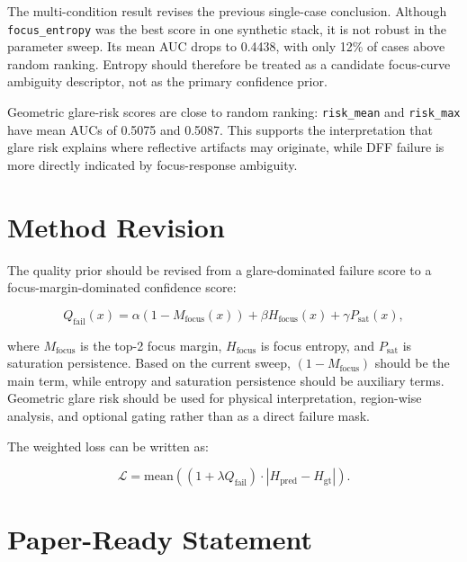 \documentclass[11pt]{article}
\begin{document}
The multi-condition result revises the previous single-case conclusion. Although \texttt{focus\_entropy} was the best score in one synthetic stack, it is not robust in the parameter sweep. Its mean AUC drops to 0.4438, with only 12\% of cases above random ranking. Entropy should therefore be treated as a candidate focus-curve ambiguity descriptor, not as the primary confidence prior.

Geometric glare-risk scores are close to random ranking: \texttt{risk\_mean} and \texttt{risk\_max} have mean AUCs of 0.5075 and 0.5087. This supports the interpretation that glare risk explains where reflective artifacts may originate, while DFF failure is more directly indicated by focus-response ambiguity.

\section{Method Revision}

The quality prior should be revised from a glare-dominated failure score to a focus-margin-dominated confidence score:

\begin{equation}
Q_{\mathrm{fail}}(x) =
\alpha (1 - M_{\mathrm{focus}}(x))
+ \beta H_{\mathrm{focus}}(x)
+ \gamma P_{\mathrm{sat}}(x),
\end{equation}

where $M_{\mathrm{focus}}$ is the top-2 focus margin, $H_{\mathrm{focus}}$ is focus entropy, and $P_{\mathrm{sat}}$ is saturation persistence. Based on the current sweep, $(1-M_{\mathrm{focus}})$ should be the main term, while entropy and saturation persistence should be auxiliary terms. Geometric glare risk should be used for physical interpretation, region-wise analysis, and optional gating rather than as a direct failure mask.

The weighted loss can be written as:

\begin{equation}
\mathcal{L} =
\mathrm{mean}\left((1 + \lambda Q_{\mathrm{fail}}) \cdot
\left|H_{\mathrm{pred}} - H_{\mathrm{gt}}\right|\right).
\end{equation}

\section{Paper-Ready Statement}
\end{document}
